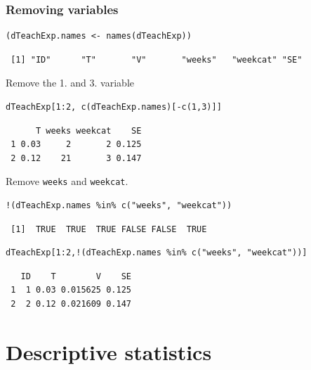 \documentclass[bigger]{beamer}
\begin{document}
\begin{frame}[fragile,shrink = 15]
\frametitle{Removing variables}
\label{sec-4-1-8}


\lstset{language=R}
\begin{lstlisting}
(dTeachExp.names <- names(dTeachExp))
\end{lstlisting}

\begin{verbatim}
 [1] "ID"      "T"       "V"       "weeks"   "weekcat" "SE"
\end{verbatim}

    Remove the 1. and 3. variable

\lstset{language=R}
\begin{lstlisting}
dTeachExp[1:2, c(dTeachExp.names)[-c(1,3)]]
\end{lstlisting}

\begin{verbatim}
      T weeks weekcat    SE
 1 0.03     2       2 0.125
 2 0.12    21       3 0.147
\end{verbatim}

     Remove \texttt{weeks} and \texttt{weekcat}.

\lstset{language=R}
\begin{lstlisting}
!(dTeachExp.names %in% c("weeks", "weekcat"))
\end{lstlisting}

\begin{verbatim}
 [1]  TRUE  TRUE  TRUE FALSE FALSE  TRUE
\end{verbatim}


\lstset{language=R}
\begin{lstlisting}
dTeachExp[1:2,!(dTeachExp.names %in% c("weeks", "weekcat"))]
\end{lstlisting}

\begin{verbatim}
   ID    T        V    SE
 1  1 0.03 0.015625 0.125
 2  2 0.12 0.021609 0.147
\end{verbatim}

\end{frame}
\section{Descriptive statistics}
\label{sec-5}
\end{document}
